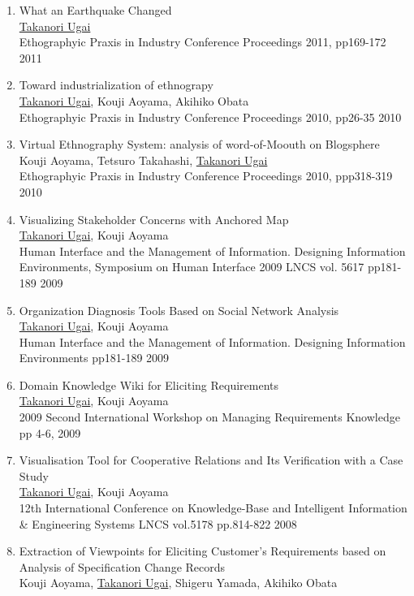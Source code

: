 \documentclass[dvipdfmx]{jlreq}
\begin{document}
\begin{enumerate}
\begin{enumerate}
\begin{enumerate}[label=\arabic*,align=right, labelsep=3pt]
Ethographyic Praxis in Industry Conference Proceedings 2012, pp376-377 2012
\item What an Earthquake Changed\\
\underline{Takanori Ugai}\\
Ethographyic Praxis in Industry Conference Proceedings 2011, pp169-172 2011
\item Toward industrialization of ethnograpy\\
\underline{Takanori Ugai}, Kouji Aoyama, Akihiko Obata\\
Ethographyic Praxis in Industry Conference Proceedings 2010, pp26-35 2010
\item Virtual Ethnography System: analysis of word-of-Moouth on Blogsphere\\
Kouji Aoyama, Tetsuro Takahashi, \underline{Takanori Ugai}\\
Ethographyic Praxis in Industry Conference Proceedings 2010, ppp318-319 2010
\item Visualizing Stakeholder Concerns with Anchored Map\\
\underline{Takanori Ugai}, Kouji Aoyama\\
Human Interface and the Management of Information. Designing Information Environments, Symposium on Human Interface 2009 LNCS vol. 5617 pp181-189 2009
\item Organization Diagnosis Tools Based on Social Network Analysis\\
\underline{Takanori Ugai}, Kouji Aoyama\\
Human Interface and the Management of Information. Designing Information Environments pp181-189 2009
\item Domain Knowledge Wiki for Eliciting Requirements\\
\underline{Takanori Ugai}, Kouji Aoyama\\
2009 Second International Workshop on Managing Requirements Knowledge pp 4-6, 2009
\item Visualisation Tool for Cooperative Relations and Its Verification with a Case Study\\
\underline{Takanori Ugai}, Kouji Aoyama\\
12th International Conference on Knowledge-Base and Intelligent Information \& Engineering Systems LNCS vol.5178 pp.814-822 2008
\item Extraction of Viewpoints for Eliciting Customer's Requirements based on Analysis of Specification Change Records\\
Kouji Aoyama, \underline{Takanori Ugai}, Shigeru Yamada, Akihiko Obata\\

\end{enumerate}
\end{enumerate}
\end{enumerate}
\end{document}
